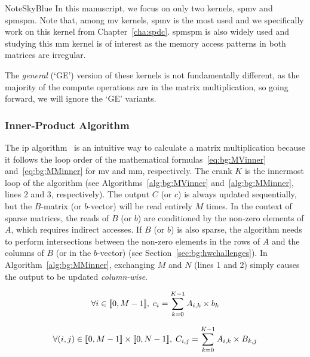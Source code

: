 \begin{highlight}{Note}{SkyBlue}
    In this manuscript, we focus on only two kernels, \acrshort{spmv} and \acrshort{spmspm}.
    Note that, among \acrshort{mv} kernels, \acrshort{spmv} is the most used and we specifically work on this kernel from Chapter~\ref{cha:spdc}.
    \acrshort{spmspm} is also widely used and studying this \acrshort{mm} kernel is of interest as the memory access patterns in both matrices are irregular.

    The \emph{general} (`GE') version of these kernels is not fundamentally different, as the majority of the compute operations are in the matrix multiplication, so going forward, we will ignore the `GE' variants.
\end{highlight}

\subsubsection{Inner-Product Algorithm}

The \acrlong{ip} algorithm~\cite{Faddeev1981_InnerOuter} is an intuitive way to calculate a matrix multiplication because it follows the loop order of the mathematical formulas~\eqref{eq:bg:MVinner} and~\eqref{eq:bg:MMinner} for \acrshort{mv} and \acrshort{mm}, respectively.
The \gls{crank} $K$ is the innermost loop of the algorithm (see Algorithms~\ref{alg:bg:MVinner} and~\ref{alg:bg:MMinner}, lines 2 and 3, respectively).
The output $C$ (or $c$) is always updated sequentially, but the $B$-matrix (or $b$-vector) will be read entirely $M$ times.
In the context of sparse matrices, the reads of $B$ (or $b$) are conditioned by the non-zero elements of $A$, which requires indirect accesses.
If $B$ (or $b$) is also sparse, the algorithm needs to perform \glspl{intersection} between the non-zero elements in the rows of $A$ and the columns of $B$ (or in the $b$-vector) (see Section~\ref{sec:bg:hwchallenges}).
In Algorithm~\ref{alg:bg:MMinner}, exchanging $M$ and $N$ (lines 1 and 2) simply causes the output to be updated \emph{column-wise}.

\begin{equation}
    \forall i \in [\![0, M-1]\!], \; c_{i} = \sum_{k = 0}^{K-1} A_{i,k} \times b_{k}
    \label{eq:bg:MVinner}
\end{equation}

\begin{equation}
    \forall (i, j) \in [\![0, M-1]\!] \times [\![0, N-1]\!], \; C_{i, j} = \sum_{k = 0}^{K-1} A_{i,k} \times B_{k,j}
    \label{eq:bg:MMinner}
\end{equation}

